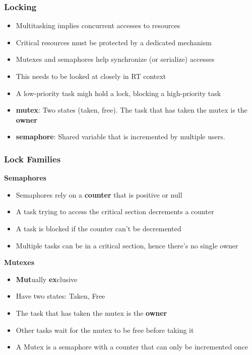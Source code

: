 \begin{frame}
  \frametitle{Locking}
        \begin{itemize}
                \item Multitasking implies concurrent accesses to resources
                \item Critical resources must be protected by a dedicated mechanism
                \item Mutexes and semaphores help synchronize (or serialize) accesses
                \item This needs to be looked at closely in RT context
                \item A low-priority task migh hold a lock, blocking a high-priority task
        \end{itemize}
        \begin{itemize}
                \item \textbf{mutex}: Two states (taken, free). The task that has taken the mutex is the \textbf{owner}
                \item \textbf{semaphore}: Shared variable that is incremented by multiple users.
        \end{itemize}
\end{frame}

\begin{frame}
        \frametitle{Lock Families}
                \begin{center}\textbf{Semaphores}\end{center}
                \begin{itemize}
                        \item Semaphores rely on a \textbf{counter} that is positive or null
                        \item A task trying to access the critical section decrements a counter
                        \item A task is blocked if the counter can't be decremented
                        \item Multiple tasks can be in a critical section, hence there's no single owner
                \end{itemize}
                \begin{center}\textbf{Mutexes}\end{center}
                \begin{itemize}
                        \item \textbf{Mut}ually \textbf{ex}clusive
                        \item Have two states: Taken, Free
                        \item The task that has taken the mutex is the \textbf{owner}
                        \item Other tasks wait for the mutex to be free before taking it
                        \item A Mutex is a semaphore with a counter that can only be incremented once
                \end{itemize}


\end{frame}

